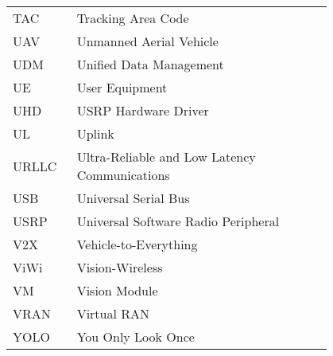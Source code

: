 \begin{flushleft}
    \begin{tabular}{l p{0.8\linewidth}}

        TAC & Tracking Area Code \\
        UAV & Unmanned Aerial Vehicle \\
        UDM & Unified Data Management \\
        UE & User Equipment \\
        UHD & USRP Hardware Driver \\
        UL & Uplink \\
        URLLC & Ultra-Reliable and Low Latency Communications \\
        USB & Universal Serial Bus \\
        USRP & Universal Software Radio Peripheral \\
        V2X & Vehicle-to-Everything \\
        ViWi & Vision-Wireless \\
        VM & Vision Module \\
        VRAN & Virtual RAN \\
        YOLO & You Only Look Once \\

    \end{tabular}
\end{flushleft}




